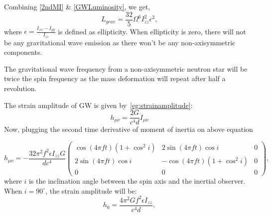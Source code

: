 \documentclass{ttuthes2007}
\begin{document}
Combining \ref{2ndMI} \& \ref{GWLuminosity}, we get,
\begin{equation}\label{Lgw}
L_{grav}= \frac{32}{5}\Omega ^6 I_{zz}^2\epsilon ^2,
\end{equation}
where $\epsilon =\frac{I_{xx}-I_{yy}}{I_{zz}}$ is defined as ellipticity. When
ellipticity is zero, there will not be any gravitational wave emission as there
won't be any non-axisymmetric components.

The gravitational wave frequency from a non-axisymmetric neutron star will be
twice the spin frequency as the mass deformation will repeat after half a
revolution.

The strain amplitude of \ac{GW} is given by~\ref{eg:strainamplitude}:
\begin{equation}
h_{\mu\nu}=\frac{2G}{c^4d}\ddot{I}_{\mu\nu}
\end{equation}
Now, plugging the second time derivative of moment of inertia on above equation

\begin{equation} \label{2ndMI}
h_{\mu\nu}=-\frac{32\pi^2f^2 \epsilon I_{zz}G}{dc^4}
\begin{pmatrix}
\cos(4\pi f t)(1+\cos^2{i}) & 2\sin{(4\pi f t)}\cos{i} & 0 \\
2\sin{(4\pi f t)}\cos{i} & -\cos{(4\pi f t)}(1+\cos ^2i) & 0 \\
0 & 0 & 0 
\end{pmatrix},
\end{equation}
where $i$ is the inclination angle between the spin axis and
the inertial observer. When $i=90^\circ$, the strain amplitude will be:
\begin{equation}
h_0=\frac{4\pi ^2Gf^2 \epsilon I_{zz}}{c^4d},
\end{equation}
\end{document}
